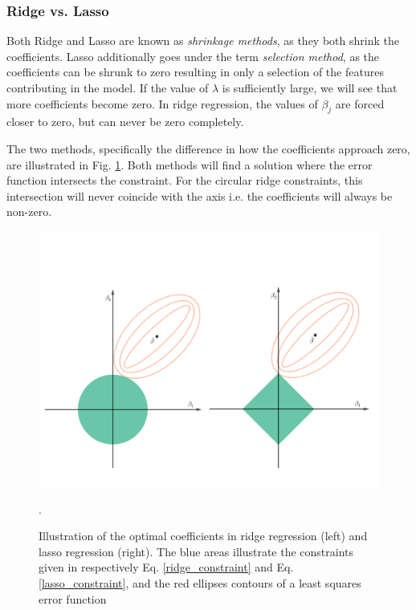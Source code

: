 \subsubsection{Ridge vs. Lasso}
Both Ridge and Lasso are known as \textit{shrinkage methods}, as they both shrink the coefficients. Lasso additionally goes under the term \textit{selection method}, as the coefficients can be shrunk to zero resulting in only a selection of the features contributing in the model. 
If the value of $\lambda$ is sufficiently large, we will see that more coefficients become zero. 
In ridge regression, the values of $\beta_j$ are forced closer to zero, but can never be zero completely. 

The two methods, specifically the difference in how the coefficients approach zero, are illustrated in Fig. \ref{fig:ridge_lasso}. Both methods will find a solution where the error function intersects the constraint. For the circular ridge constraints, this intersection will never coincide with the axis i.e. the coefficients will always be non-zero. 

\begin{figure}[h!]
    \centering
    \includegraphics[width=1\linewidth]{project_1/figures/ridge-lasso.png}
    \caption{Illustration of the optimal coefficients in ridge regression (left) and lasso regression (right). The blue areas illustrate the constraints given in respectively Eq. \ref{ridge_constraint} and Eq. \ref{lasso_constraint}, and the red ellipses contours of a least squares error function \cite[Taken from][]{hastie}}.
    \label{fig:ridge_lasso}
\end{figure}



